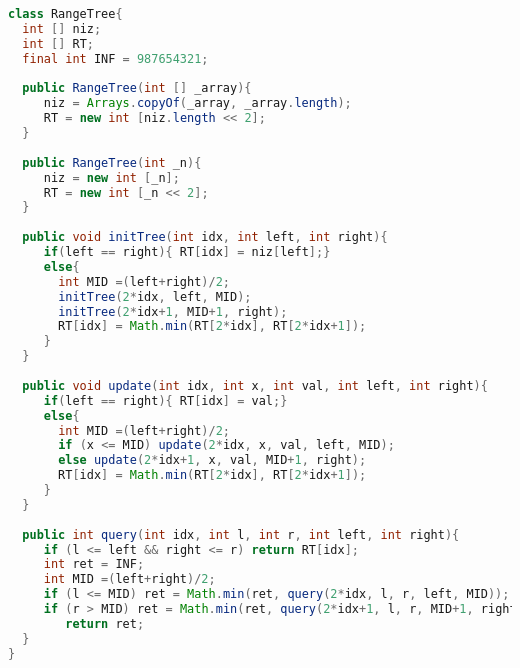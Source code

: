 \begin{lstlisting}[language=Java]
class RangeTree{
  int [] niz;
  int [] RT;
  final int INF = 987654321;
	
  public RangeTree(int [] _array){
     niz = Arrays.copyOf(_array, _array.length);
     RT = new int [niz.length << 2];
  }
	
  public RangeTree(int _n){
     niz = new int [_n]; 
     RT = new int [_n << 2];
  }
	
  public void initTree(int idx, int left, int right){
     if(left == right){ RT[idx] = niz[left];}
     else{
       int MID =(left+right)/2;
       initTree(2*idx, left, MID);
       initTree(2*idx+1, MID+1, right);
       RT[idx] = Math.min(RT[2*idx], RT[2*idx+1]);
     }
  }
	
  public void update(int idx, int x, int val, int left, int right){
     if(left == right){ RT[idx] = val;}
     else{
       int MID =(left+right)/2;
       if (x <= MID) update(2*idx, x, val, left, MID);
       else update(2*idx+1, x, val, MID+1, right);
       RT[idx] = Math.min(RT[2*idx], RT[2*idx+1]);
     }
  }
	
  public int query(int idx, int l, int r, int left, int right){
     if (l <= left && right <= r) return RT[idx];
	 int ret = INF;
     int MID =(left+right)/2;
     if (l <= MID) ret = Math.min(ret, query(2*idx, l, r, left, MID));
     if (r > MID) ret = Math.min(ret, query(2*idx+1, l, r, MID+1, right));
        return ret;
  }	
}	
\end{lstlisting} 